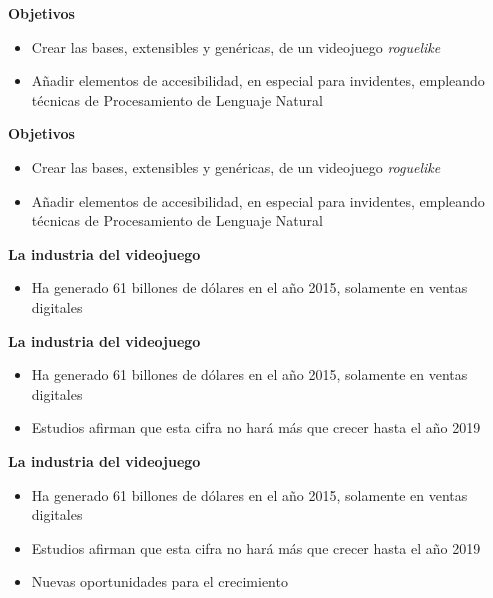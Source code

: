 \titlepageframe %


\begin{tframe}{\textbf{Objetivos}}
	\begin{itemize}
			\item Crear las bases, extensibles y genéricas, de un videojuego \textit{roguelike}
			\item Añadir elementos de accesibilidad, en especial para invidentes, empleando técnicas de Procesamiento de Lenguaje Natural
	\end{itemize}
\end{tframe}


\begin{tframe}{\textbf{Objetivos}}
	\begin{itemize}
			\item<+-| alert@+> Crear las bases, extensibles y genéricas, de un videojuego \textit{roguelike}
			\item Añadir elementos de accesibilidad, en especial para invidentes, empleando técnicas de Procesamiento de Lenguaje Natural
	\end{itemize}
\end{tframe}

\begin{tframe}{\textbf{La industria del videojuego}}
	\begin{itemize}
			\item<+-| alert@+> Ha generado 61 billones de dólares en el año 2015, solamente en ventas digitales
	\end{itemize}
\end{tframe}

\begin{tframe}{\textbf{La industria del videojuego}}
	\begin{itemize}
			\item Ha generado 61 billones de dólares en el año 2015, solamente en ventas digitales
			\item<+-| alert@+> Estudios afirman que esta cifra no hará más que crecer hasta el año 2019
	\end{itemize}
\end{tframe}

\begin{tframe}{\textbf{La industria del videojuego}}
	\begin{itemize}
			\item Ha generado 61 billones de dólares en el año 2015, solamente en ventas digitales
			\item Estudios afirman que esta cifra no hará más que crecer hasta el año 2019
			\item<+-| alert@+> Nuevas oportunidades para el crecimiento
	\end{itemize}
\end{tframe}

